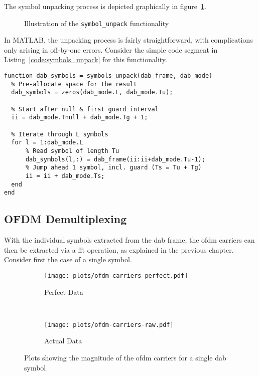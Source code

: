 \documentclass[class=report,11pt,crop=false]{standalone}
\begin{document}
The symbol unpacking process is depicted graphically in figure~\ref{fig:symbols_unpack}.

\begin{figure}[htbp]
  \centering
  \captionsetup{type=figure}
  \def\svgwidth{\linewidth}
  { %
      }
  \caption{Illustration of the \texttt{symbol\_unpack} functionality}
  \label{fig:symbols_unpack}
\end{figure}

In MATLAB, the unpacking process is fairly straightforward, with complications only arising in off-by-one errors. Consider the simple code segment in Listing~\ref{code:symbols_unpack} for this functionality.

\begin{lstlisting}[caption={Code used in the \texttt{symbols\_unpack} function}, label={code:symbols_unpack}]
function dab_symbols = symbols_unpack(dab_frame, dab_mode)
  % Pre-allocate space for the result
  dab_symbols = zeros(dab_mode.L, dab_mode.Tu);

  % Start after null & first guard interval
  ii = dab_mode.Tnull + dab_mode.Tg + 1;

  % Iterate through L symbols
  for l = 1:dab_mode.L
      % Read symbol of length Tu
      dab_symbols(l,:) = dab_frame(ii:ii+dab_mode.Tu-1);
      % Jump ahead 1 symbol, incl. guard (Ts = Tu + Tg)
      ii = ii + dab_mode.Ts;
  end
end
\end{lstlisting}

\subsection{OFDM Demultiplexing \label{subsect:dab-proc_ofdm-demux}}
With the individual symbols extracted from the \gls{dab} frame, the \gls{ofdm} carriers can then be extracted via a \gls{fft} operation, as explained in the previous chapter. Consider first the case of a single symbol.

\begin{figure}[htbp]
  \centering
  \captionsetup{type=figure}
  \begin{subfigure}[t]{0.45\textwidth}
    \centering
    \captionsetup{type=figure}
    \texttt{[image: plots/ofdm-carriers-perfect.pdf]}
    \caption{Perfect Data}
    \label{fig:ofdm-carriers-perfect}
  \end{subfigure}%
  ~ 
  \begin{subfigure}[t]{0.45\textwidth}
    \centering
    \captionsetup{type=figure}
    \texttt{[image: plots/ofdm-carriers-raw.pdf]}
    \caption{Actual Data}
    \label{fig:ofdm-carriers-raw}
  \end{subfigure}
  \caption{Plots showing the magnitude of the \gls{ofdm} carriers for a single \gls{dab} symbol}
  \label{fig:dqpsk_demap_perfect}
\end{figure}
\end{document}
